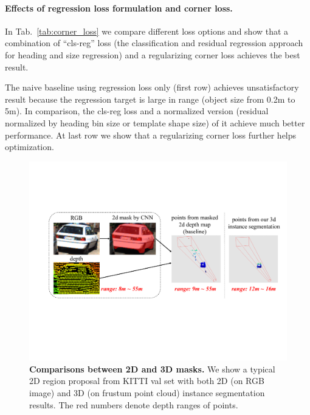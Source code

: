 \vspace{-.15in}
\paragraph{Effects of regression loss formulation and corner loss.} In Tab.~\ref{tab:corner_loss} we compare different loss options and show that a combination of ``cls-reg'' loss (the classification and residual regression approach for heading and size regression) and a regularizing corner loss achieves the best result.

The naive baseline using regression loss only (first row) achieves unsatisfactory result because the regression target is large in range (object size from 0.2m to 5m). In comparison, the cls-reg loss and a normalized version (residual normalized by heading bin size or template shape size) of it achieve much better performance. At last row we show that a regularizing corner loss further helps optimization.


\begin{figure}[t!]
    \centering
    \includegraphics[width=0.96\linewidth]{fig/mask2d3d.pdf}
    \caption{\textbf{Comparisons between 2D and 3D masks.} We show a typical 2D region proposal from KITTI val set with both 2D (on RGB image) and 3D (on frustum point cloud) instance segmentation results. The red numbers denote depth ranges of points.}
    \label{fig:mask2d3d}
\end{figure}


